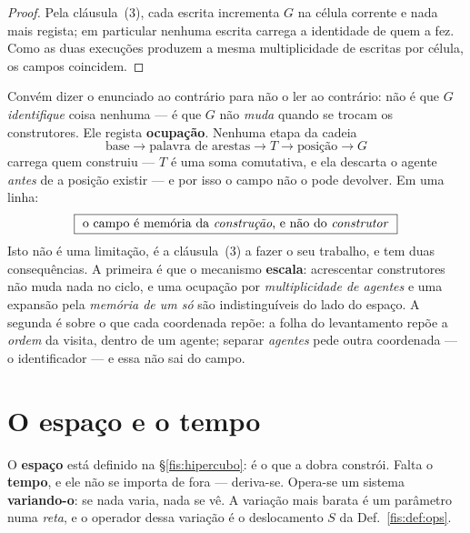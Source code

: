 \documentclass[livro.tex]{subfiles}
\begin{document}
\begin{proof}
Pela cláusula~(3), cada escrita incrementa $G$ na célula corrente e nada mais
regista; em particular nenhuma escrita carrega a identidade de quem a fez. Como
as duas execuções produzem a mesma multiplicidade de escritas por célula, os
campos coincidem.
\end{proof}

\medskip\noindent Convém dizer o enunciado ao contrário para não o ler ao
contrário: não é que $G$ \emph{identifique} coisa nenhuma --- é que $G$ não
\emph{muda} quando se trocam os construtores. Ele regista \textbf{ocupação}.
Nenhuma etapa da cadeia
\[
\text{base}\longrightarrow\text{palavra de arestas}\longrightarrow T
\longrightarrow\text{posição}\longrightarrow G
\]
carrega quem construiu --- $T$ é uma soma comutativa, e ela descarta o agente
\emph{antes} de a posição existir --- e por isso o campo não o pode devolver. Em
uma linha:
\[
\boxed{\ \text{o campo é memória da \emph{construção}, e não do \emph{construtor}}\ }
\]
Isto não é uma limitação, é a cláusula~(3) a fazer o seu trabalho, e tem duas
consequências. A primeira é que o mecanismo \textbf{escala}: acrescentar
construtores não muda nada no ciclo, e uma ocupação por \emph{multiplicidade de
agentes} e uma expansão pela \emph{memória de um só} são indistinguíveis do lado
do espaço. A segunda é sobre o que cada coordenada repõe: a folha do
levantamento repõe a \emph{ordem} da visita, dentro de um agente; separar
\emph{agentes} pede outra coordenada --- o identificador --- e essa não sai do
campo.


\section{O espaço e o tempo}\label{fis:tempo}

\noindent O \textbf{espaço} está definido na §\ref{fis:hipercubo}: é o que a dobra
constrói. Falta o \textbf{tempo}, e ele não se importa de fora --- deriva-se.
Opera-se um sistema \textbf{variando-o}: se nada varia, nada se vê. A variação
mais barata é um parâmetro numa \emph{reta}, e o operador dessa variação é o
deslocamento $S$ da Def.~\ref{fis:def:ops}.
\end{document}
